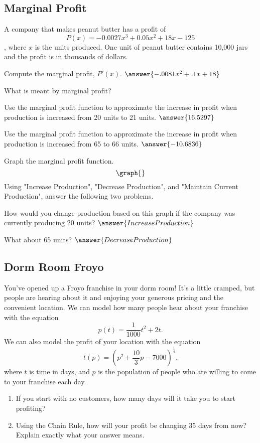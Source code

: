 \documentclass[handout]{ximera}
\begin{document}
\subsection{Marginal Profit}
A company that makes peanut butter has a profit of $$P(x)=-0.0027x^3+0.05x^2+18x-125$$, where $x$ is the units produced. One unit of peanut butter contains 10,000 jars and the profit is in thousands of dollars.
\begin{question}
Compute the marginal profit, $P'(x)$. $\answer{-.0081x^2+.1x+18}$
\end{question}
\begin{question}
What is meant by marginal profit?
\begin{freeResponse}
\end{freeResponse}
\end{question}
\begin{question}
Use the marginal profit function to approximate the increase in profit when production is increased from 20 units to 21 units.
$\answer{16.5297}$
\end{question}
\begin{question}
Use the marginal profit function to approximate the increase in profit when production is increased from 65 to 66 units. $\answer{-10.6836}$
\end{question}
Graph the marginal profit function.
\[
\graph{}
\]
Using "Increase Production", "Decrease Production", and "Maintain Current Production", answer the following two problems.
\begin{question}
How would you change production based on this graph if the company was currently producing 20 units? $\answer{Increase Production}$
\end{question}
\begin{question}
What about 65 units? $\answer{Decrease Production}$
\end{question}
\subsection{Dorm Room Froyo}
You've opened up a Froyo franchise in your dorm room! It's a little cramped, but people are hearing about it and enjoying your generous pricing and the convenient location. We can model how many people hear about your franchise with the equation $$p(t) = \frac{1}{1000}t^2 + 2t \text{.}$$ We can also model the profit of your location with the equation $$t(p) = (p^2 + \frac{10}{3}p - 7000)^{\frac{1}{4}} \text{,}$$ where $t$ is time in days, and $p$ is the population of people who are willing to come to your franchise each day.

\begin{enumerate}
\item{If you start with no customers, how many days will it take you to start profiting?}
\item{Using the Chain Rule, how will your profit be changing 35 days from now? Explain exactly what your answer means.}
\end{enumerate}
\pagebreak
\end{document}
